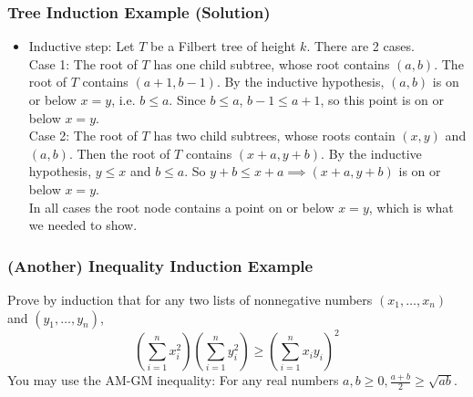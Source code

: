 \documentclass{beamer}
\newcommand{\blank}{\underbar{\hphantom{aaaaaaaa}}}
\begin{document}

\begin{frame}[t]
  \frametitle{Tree Induction Example (Solution)}
  \begin{itemize}
    \item Inductive step: Let $T$ be a Filbert tree of height $k$. There are 2 cases. \\
    Case 1: The root of $T$ has one child subtree, whose root contains $(a, b)$. The root of $T$ contains $(a+1, b-1)$. By the inductive hypothesis, $(a, b)$ is on or below $x = y$, i.e. $b \leq a$. Since $b \leq a$, $b-1 \leq a+1$, so this point is on or below $x=y$. \\
    Case 2: The root of $T$ has two child subtrees, whose roots contain $(x,y)$ and $(a, b)$. Then the root of $T$ contains $(x+a, y+b)$. By the inductive hypothesis, $y \leq x$ and $b \leq a$. So $y+b \leq x+a \implies (x+a, y+b)$ is on or below $x=y$. \\
    In all cases the root node contains a point on or below $x = y$, which is what we needed to show.
  \end{itemize}
\end{frame}

\begin{frame}[t]
  \frametitle{(Another) Inequality Induction Example}
  Prove by induction that for any two lists of nonnegative numbers $(x_1, \ldots, x_n)$ and $(y_1, \ldots, y_n)$, 
  $$\left(\sum_{i = 1}^n x_i^2\right)\left(\sum_{i = 1}^n y_i^2\right) \geq \left(\sum_{i = 1}^n x_iy_i\right)^2$$
  You may use the AM-GM inequality: For any real numbers $a, b \geq 0, \frac{a + b}{2} \geq \sqrt{ab}$.
\end{frame}
\end{document}
